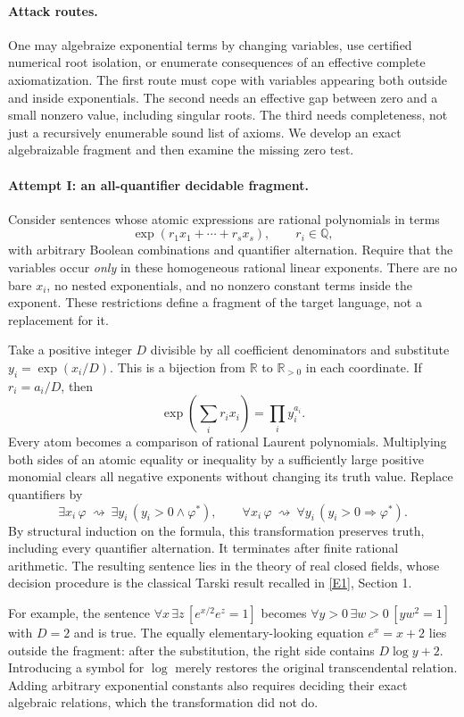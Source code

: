 \documentclass[11pt,a4paper]{article}
\newcommand{\Q}{\mathbb{Q}}
\newcommand{\R}{\mathbb{R}}
\newcommand{\eref}[2]{\hyperlink{extra:#1:#2}{[E#2]}}
\numberwithin{equation}{section}
\begin{document}
\paragraph{Attack routes.}
One may algebraize exponential terms by changing variables, use certified
numerical root isolation, or enumerate consequences of an effective
complete axiomatization.  The first route must cope with variables
appearing both outside and inside exponentials.  The second needs an
effective gap between zero and a small nonzero value, including singular
roots.  The third needs completeness, not just a recursively enumerable
sound list of axioms.  We develop an exact algebraizable fragment and
then examine the missing zero test.

\paragraph{Attempt I: an all-quantifier decidable fragment.}
Consider sentences whose atomic expressions are rational polynomials in
terms
\[
 \exp(r_1x_1+\cdots+r_sx_s),\qquad r_i\in\Q,
\]
with arbitrary Boolean combinations and quantifier alternation.  Require
that the variables occur \emph{only} in these homogeneous rational
linear exponents.  There are no bare $x_i$, no nested exponentials, and
no nonzero constant terms inside the exponent.  These restrictions
define a fragment of the target language, not a replacement for it.

Take a positive integer $D$ divisible by all coefficient denominators
and substitute $y_i=\exp(x_i/D)$.  This is a bijection from $\R$ to
$\R_{>0}$ in each coordinate.  If $r_i=a_i/D$, then
\[
 \exp\!\left(\sum_i r_i x_i\right)=\prod_i y_i^{a_i}.
\]
Every atom becomes a comparison of rational Laurent polynomials.
Multiplying both sides of an atomic equality or inequality by a
sufficiently large positive monomial clears all negative exponents
without changing its truth value.  Replace quantifiers by
\[
 \exists x_i\,\varphi\ \rightsquigarrow\
 \exists y_i\,(y_i>0\wedge\varphi^*),\qquad
 \forall x_i\,\varphi\ \rightsquigarrow\
 \forall y_i\,(y_i>0\Rightarrow\varphi^*).
\]
By structural induction on the formula, this transformation preserves
truth, including every quantifier alternation.  It terminates after
finite rational arithmetic.  The resulting sentence lies in the theory
of real closed fields, whose decision procedure is the classical
Tarski result recalled in \eref{statement}{1}, Section 1.

For example, the sentence
$\forall x\,\exists z\,[e^{x/2}e^z=1]$ becomes
$\forall y>0\,\exists w>0\,[yw^2=1]$ with $D=2$ and is true.
The equally elementary-looking equation $e^x=x+2$ lies outside the
fragment: after the substitution, the right side contains $D\log y+2$.
Introducing a symbol for $\log$ merely restores the original
transcendental relation.  Adding arbitrary exponential constants also
requires deciding their exact algebraic relations, which the
transformation did not do.
\end{document}
